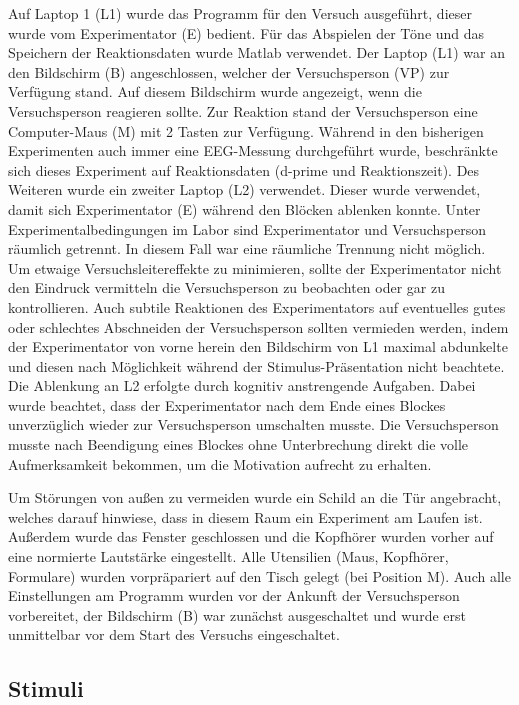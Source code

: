 \documentclass[doc,a4paper,12pt]{apa6}
\begin{document}

Auf Laptop 1 (L1) wurde das Programm für den Versuch ausgeführt, dieser wurde vom Experimentator (E) bedient. Für das Abspielen der Töne und das Speichern der Reaktionsdaten wurde Matlab verwendet. Der Laptop (L1) war an den Bildschirm (B) angeschlossen, welcher der Versuchsperson (VP) zur Verfügung stand. Auf diesem Bildschirm wurde angezeigt, wenn die Versuchsperson reagieren sollte. Zur Reaktion stand der Versuchsperson eine Computer-Maus (M) mit 2 Tasten zur Verfügung. Während in den bisherigen Experimenten auch immer eine EEG-Messung durchgeführt wurde, beschränkte sich dieses Experiment auf Reaktionsdaten (d-prime und Reaktionszeit). Des Weiteren wurde ein zweiter Laptop (L2) verwendet. Dieser wurde verwendet, damit sich Experimentator (E) während den Blöcken ablenken konnte. Unter Experimentalbedingungen im Labor sind Experimentator und Versuchsperson räumlich getrennt. In diesem Fall war eine räumliche Trennung nicht möglich. Um etwaige Versuchsleitereffekte zu minimieren, sollte der Experimentator nicht den Eindruck vermitteln die Versuchsperson zu beobachten oder gar zu kontrollieren. Auch subtile Reaktionen des Experimentators auf eventuelles gutes oder schlechtes Abschneiden der Versuchsperson sollten vermieden werden, indem der Experimentator von vorne herein den Bildschirm von L1 maximal abdunkelte und diesen nach Möglichkeit während der Stimulus-Präsentation nicht beachtete. Die Ablenkung an L2 erfolgte durch kognitiv anstrengende Aufgaben. Dabei wurde beachtet, dass der Experimentator nach dem Ende eines Blockes unverzüglich wieder zur Versuchsperson umschalten musste. Die Versuchsperson musste nach Beendigung eines Blockes ohne Unterbrechung direkt die volle Aufmerksamkeit bekommen, um die Motivation aufrecht zu erhalten.

Um Störungen von außen zu vermeiden wurde ein Schild an die Tür angebracht, welches darauf hinwiese, dass in diesem Raum ein Experiment am Laufen ist. Außerdem wurde das Fenster geschlossen und die Kopfhörer wurden vorher auf eine normierte Lautstärke eingestellt. Alle Utensilien (Maus, Kopfhörer, Formulare) wurden vorpräpariert auf den Tisch gelegt (bei Position M). Auch alle Einstellungen am Programm wurden vor der Ankunft der Versuchsperson vorbereitet, der Bildschirm (B) war zunächst ausgeschaltet und wurde erst unmittelbar vor dem Start des Versuchs eingeschaltet.

\subsection{Stimuli}
\end{document}
